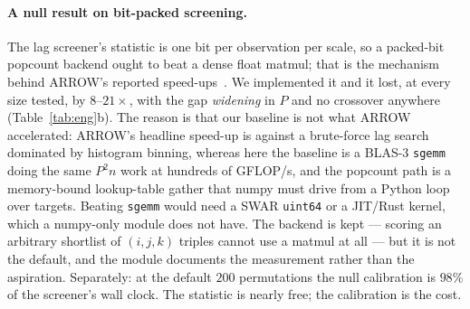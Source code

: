 \documentclass[10pt,twocolumn]{article}
\begin{document}
\paragraph{A null result on bit-packed screening.} The lag screener's statistic is one
bit per observation per scale, so a packed-bit popcount backend ought to beat a dense
float matmul; that is the mechanism behind ARROW's reported
speed-ups~\cite{arrow2025}. We implemented it and it lost, at every size tested, by
$8$--$21\times$, with the gap \emph{widening} in $P$ and no crossover anywhere
(Table~\ref{tab:eng}b). The reason is that our baseline is not what ARROW accelerated:
ARROW's headline speed-up is against a brute-force lag search dominated by histogram
binning, whereas here the baseline is a BLAS-3 \texttt{sgemm} doing the same $P^2n$ work
at hundreds of GFLOP/s, and the popcount path is a memory-bound lookup-table gather that
numpy must drive from a Python loop over targets. Beating \texttt{sgemm} would need a
SWAR \texttt{uint64} or a JIT/Rust kernel, which a numpy-only module does not have. The
backend is kept --- scoring an arbitrary shortlist of $(i,j,k)$ triples cannot use a
matmul at all --- but it is not the default, and the module documents the measurement
rather than the aspiration. Separately: at the default $200$ permutations the null
calibration is $98\%$ of the screener's wall clock. The statistic is nearly free; the
calibration is the cost.
\end{document}
